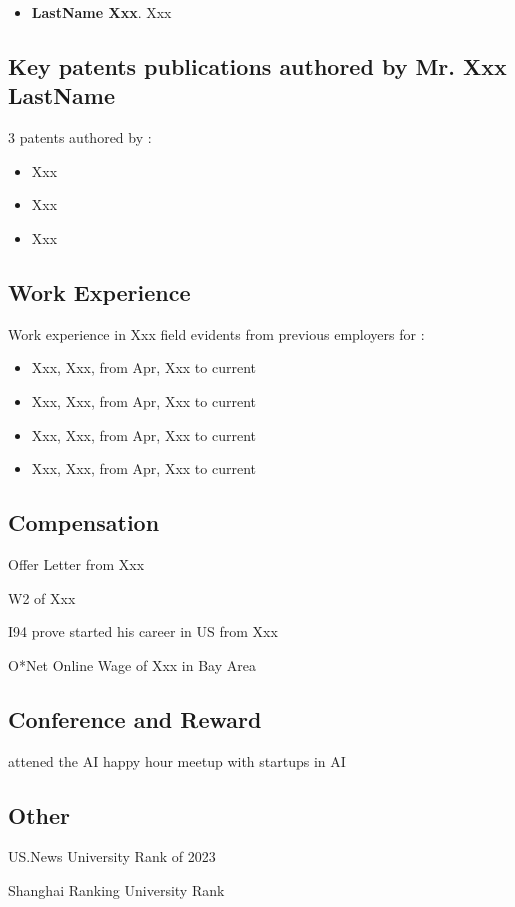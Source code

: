 \documentclass[11pt]{article}
\begin{document}
\begin{thebibliography}{9}
\begin{itemize}
    \item \textbf{LastName Xxx}. Xxx
\end{itemize}


\subsection*{Key patents publications authored by Mr. Xxx LastName}


3 patents authored by \dr:
\begin{itemize}
    \item Xxx

    \item Xxx

    \item Xxx
\end{itemize}


\subsection*{Work Experience}

Work experience in Xxx field evidents from previous employers for \dr:
\begin{itemize}
 \item Xxx, Xxx, from Apr, Xxx to current
 \item Xxx, Xxx, from Apr, Xxx to current
 \item Xxx, Xxx, from Apr, Xxx to current
 \item Xxx, Xxx, from Apr, Xxx to current
\end{itemize}


\subsection*{Compensation}

\drs Offer Letter from Xxx

\drs W2 of Xxx

\drs I94 prove started his career in US from Xxx

O*Net Online Wage of Xxx in Bay Area



\subsection*{Conference and Reward}

\dr attened the AI happy hour meetup with startups in AI



\subsection*{Other}

US.News University Rank of 2023

Shanghai Ranking University Rank




\end{thebibliography}
\end{document}
